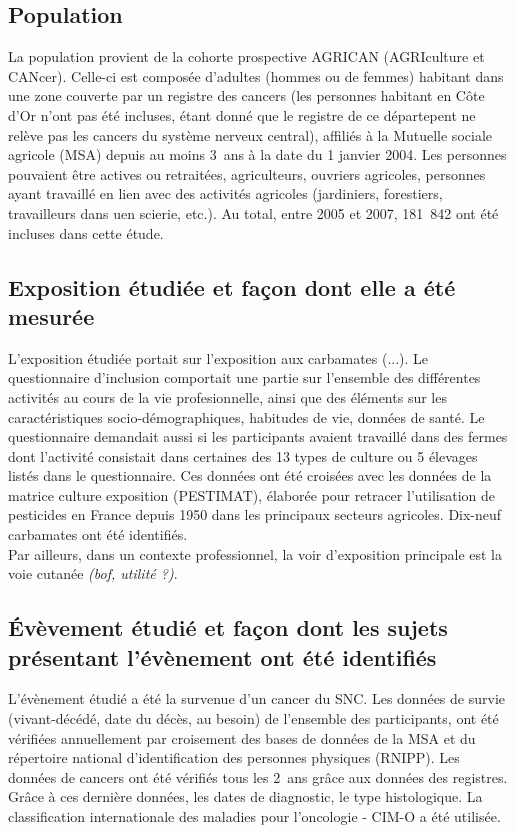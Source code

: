 \documentclass[10pt]{article}
\begin{document}
\subsection{Population}
La population provient de la cohorte prospective AGRICAN (AGRIculture et CANcer). Celle-ci est composée d'adultes (hommes ou de femmes) habitant dans une zone couverte par un registre des cancers (les personnes habitant en Côte d'Or n'ont pas été incluses, étant donné que le registre de ce départepent ne relève pas les cancers du système nerveux central), affiliés à la Mutuelle sociale agricole (MSA) depuis au moins 3~ans à la date du 1 janvier 2004. Les personnes pouvaient être actives ou retraitées, agriculteurs, ouvriers agricoles, personnes ayant travaillé en lien avec des activités agricoles (jardiniers, forestiers, travailleurs dans uen scierie, etc.). Au total, entre 2005 et 2007, 181~842 ont été incluses dans cette étude.

\subsection{Exposition étudiée et façon dont elle a été mesurée}
\label{exposition}
L'exposition étudiée portait sur l'exposition aux carbamates (...). Le questionnaire d'inclusion comportait une partie sur l'ensemble des différentes activités au cours de la vie profesionnelle, ainsi que des éléments sur les caractéristiques socio-démographiques, habitudes de vie, données de santé. Le questionnaire demandait aussi si les participants avaient travaillé dans des fermes dont l'activité consistait dans certaines des 13 types de culture ou 5 élevages listés dans le questionnaire. Ces données ont été croisées avec les données de la matrice culture exposition (PESTIMAT), élaborée pour retracer l'utilisation de pesticides en France depuis 1950 dans les principaux secteurs agricoles. Dix-neuf carbamates ont été identifiés.\\
Par ailleurs, dans un contexte professionnel, la voir d'exposition principale est la voie cutanée \emph{(bof, utilité ?)}.

\subsection{\'{E}vèvement étudié et façon dont les sujets présentant l'évènement ont été identifiés}
L'évènement étudié a été la survenue d'un cancer du SNC. Les données de survie (vivant-décédé, date du décès, au besoin) de l'ensemble des participants, ont été vérifiées annuellement par croisement des bases de données de la MSA et du répertoire national d'identification des personnes physiques (RNIPP). Les données de cancers ont été vérifiés tous les 2~ans grâce aux données des registres. Grâce à ces dernière données, les dates de diagnostic, le type histologique. La classification internationale des maladies pour l'oncologie - CIM-O a été utilisée.
\end{document}
